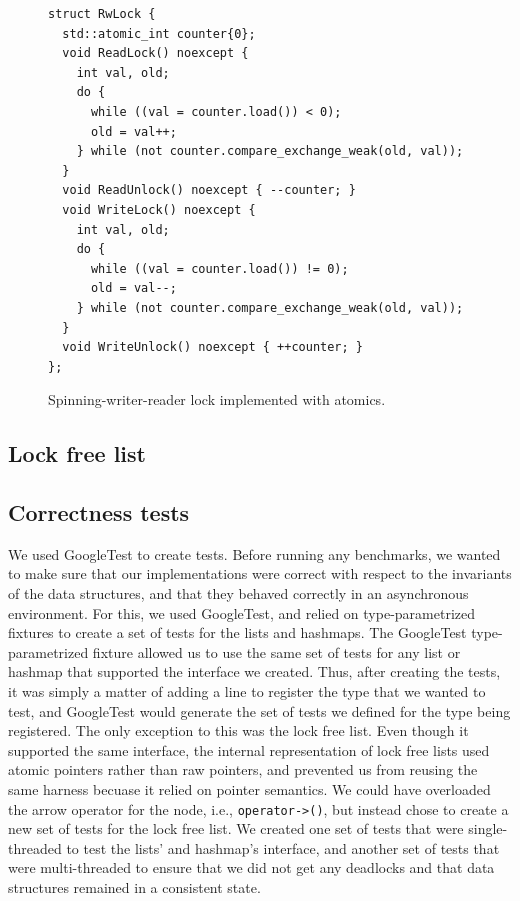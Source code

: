 \documentclass[11pt]{article}
\begin{document}
\begin{figure}
\begin{center}
\begin{lstlisting}
struct RwLock {
  std::atomic_int counter{0};
  void ReadLock() noexcept {
    int val, old;
    do {
      while ((val = counter.load()) < 0);
      old = val++;
    } while (not counter.compare_exchange_weak(old, val));
  }
  void ReadUnlock() noexcept { --counter; }
  void WriteLock() noexcept {
    int val, old;
    do {
      while ((val = counter.load()) != 0);
      old = val--;
    } while (not counter.compare_exchange_weak(old, val));
  }
  void WriteUnlock() noexcept { ++counter; }
};
\end{lstlisting}
\caption{Spinning-writer-reader lock implemented with atomics.}
\label{fig:rwlock}
\end{center}
\end{figure}

\subsection{Lock free list}

\subsection{Correctness tests}
We used GoogleTest to create tests. Before running any benchmarks, we wanted to
make sure that our implementations were correct with respect to the invariants
of the data structures, and that they behaved correctly in an asynchronous
environment. For this, we used GoogleTest, and relied on type-parametrized
fixtures to create a set of tests for the lists and hashmaps. The GoogleTest
type-parametrized fixture allowed us to use the same set of tests for any list
or hashmap that supported the interface we created. Thus, after creating the
tests, it was simply a matter of adding a line to register the type that we
wanted to test, and GoogleTest would generate the set of tests we defined for
the type being registered. The only exception to this was the lock free list.
Even though it supported the same interface, the internal representation of lock
free lists used atomic pointers rather than raw pointers, and prevented us from
reusing the same harness becuase it relied on pointer semantics. We could have
overloaded the arrow operator for the node, i.e., {\tt operator->()}, but
instead chose to create a new set of tests for the lock free list. We created
one set of tests that were single-threaded to test the lists' and hashmap's
interface, and another set of tests that were multi-threaded to ensure that we
did not get any deadlocks and that data structures remained in a consistent
state.
\end{document}

